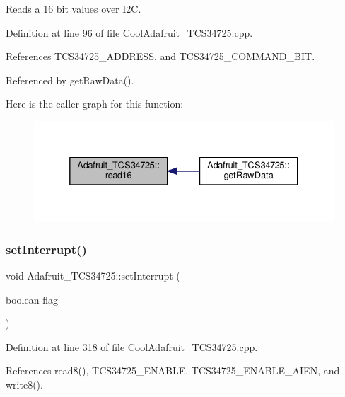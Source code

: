 Reads a 16 bit values over I2C. 



Definition at line 96 of file Cool\+Adafruit\+\_\+\+T\+C\+S34725.\+cpp.



References T\+C\+S34725\+\_\+\+A\+D\+D\+R\+E\+SS, and T\+C\+S34725\+\_\+\+C\+O\+M\+M\+A\+N\+D\+\_\+\+B\+IT.



Referenced by get\+Raw\+Data().

Here is the caller graph for this function\+:
\nopagebreak
\begin{figure}[H]
\begin{center}
\leavevmode
\includegraphics[width=332pt]{df/d54/class_adafruit___t_c_s34725_a6b9b65ff0f1e57797a1c05a43fd25385_icgraph}
\end{center}
\end{figure}
\mbox{\label{class_adafruit___t_c_s34725_ae477b116ac93cf075be20637207aee57}} 
\subsubsection{\texorpdfstring{set\+Interrupt()}{setInterrupt()}}
{\footnotesize\ttfamily void Adafruit\+\_\+\+T\+C\+S34725\+::set\+Interrupt (\begin{DoxyParamCaption}\item[{boolean}]{flag }\end{DoxyParamCaption})}



Definition at line 318 of file Cool\+Adafruit\+\_\+\+T\+C\+S34725.\+cpp.



References read8(), T\+C\+S34725\+\_\+\+E\+N\+A\+B\+LE, T\+C\+S34725\+\_\+\+E\+N\+A\+B\+L\+E\+\_\+\+A\+I\+EN, and write8().

